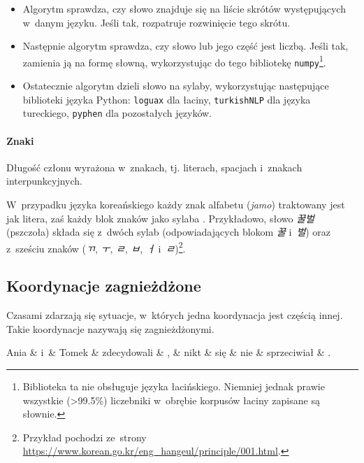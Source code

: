 \begin{itemize}

\item Algorytm sprawdza, czy słowo znajduje się na liście skrótów występujących w~danym języku. Jeśli tak, rozpatruje rozwinięcie tego skrótu.
\item Następnie algorytm sprawdza, czy słowo lub jego część jest liczbą. Jeśli tak, zamienia ją na formę słowną, wykorzystując do tego bibliotekę \texttt{numpy}\footnote{
Biblioteka ta nie obsługuje języka łacińskiego. Niemniej jednak prawie wszystkie (>99.5\%) liczebniki w~obrębie korpusów łaciny zapisane są słownie.}.
\item Ostatecznie algorytm dzieli słowo na sylaby, wykorzystując następujące biblioteki języka Python:
\subitem \texttt{loguax} dla łaciny,
\subitem \texttt{turkishNLP} dla języka tureckiego,
\subitem \texttt{pyphen} dla pozostałych języków.
\end{itemize}

\paragraph{Znaki}
Długość członu wyrażona w~znakach, tj. literach, spacjach i~znakach interpunkcyjnych. 


W~przypadku języka koreańskiego każdy znak alfabetu (\textit{jamo}) traktowany jest jak litera, zaś każdy blok znaków jako sylaba \citep{simpson2004syllable}. Przykładowo, słowo \textit{꿀벌} (pszczoła) składa się z~dwóch sylab (odpowiadających blokom \textit{꿀} i~\textit{벌}) oraz z~sześciu znaków (\textit{ㄲ}, \textit{ㅜ}, \textit{ㄹ}, \textit{ㅂ}, \textit{ㅓ} i~\textit{ㄹ})\footnote{Przykład pochodzi ze~strony \url{https://www.korean.go.kr/eng_hangeul/principle/001.html}.}.


\subsection{Koordynacje zagnieżdżone}

Czasami zdarzają się sytuacje, w~których jedna koordynacja jest częścią innej. Takie koordynacje nazywają się zagnieżdżonymi.  

\begin{exe}
\ex \label{zagnieżdżona}
\begin{dependency}[baseline=-\the\dimexpr\fontdimen22\textfont2\relax]
\begin{deptext}[column sep=1em]
Ania \& i~\& Tomek \& zdecydowali \& , \& nikt \& się \& nie \& sprzeciwiał \& .  \\ 
\end{deptext}
\end{dependency}
\end{exe}


